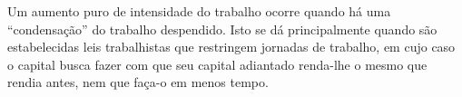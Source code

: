 \documentclass[12pt]{article}
\numberwithin{equation}{section}
\theoremstyle{plain}
\theoremstyle{definition}
\theoremstyle{remark}
\begin{document}
Um aumento puro de intensidade do trabalho ocorre quando há uma ``condensação'' do trabalho despendido. Isto se dá principalmente quando são estabelecidas leis trabalhistas que restringem jornadas de trabalho, em cujo caso o capital busca fazer com que seu capital adiantado renda-lhe o mesmo que rendia antes, nem que faça-o em menos tempo.


\printbibliography
\end{document}

